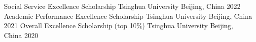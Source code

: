 


\begin{cvhonors}

  \cvhonor
    {Social Service Excellence Scholarship} %
    {Tsinghua University} %
    {Beijing, China} %
    {2022} %
  \cvhonor
    {Academic Performance Excellence Scholarship} %
    {Tsinghua University} %
    {Beijing, China} %
    {2021} %
  \cvhonor
    {Overall Excellence Scholarship (top 10\%)} %
    {Tsinghua University} %
    {Beijing, China} %
    {2020} %
\end{cvhonors}
